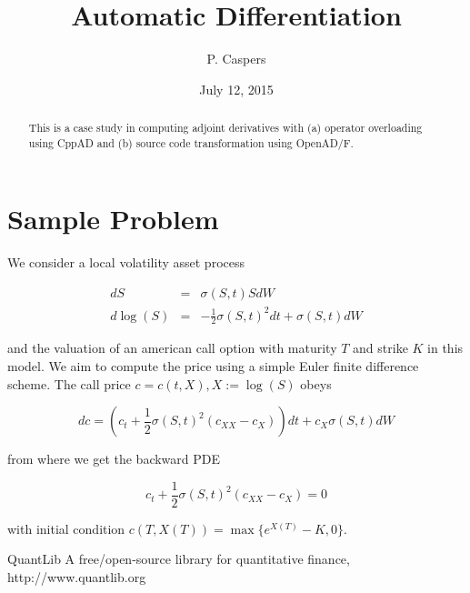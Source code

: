 \documentclass{amsart}
\theoremstyle{plain}
\numberwithin{equation}{section}
\begin{document}
\title[AD]{Automatic Differentiation}
\author{P. Caspers}
\date{July 12, 2015}
\begin{abstract}
This is a case study in computing adjoint derivatives with (a) operator overloading using CppAD and (b) source code transformation using OpenAD/F.
\end{abstract}

\maketitle

\tableofcontents

\section{Sample Problem}

We consider a local volatility asset process 

\begin{eqnarray}
dS &=& \sigma(S,t) S dW \\
d\log(S) &=& -\frac{1}{2}\sigma(S,t)^2 dt + \sigma(S,t) dW
\end{eqnarray}

and the valuation of an american call option with maturity $T$ and strike $K$ in this model. We aim to compute the price using a simple Euler finite difference scheme. The call price $c = c(t,X), X:=\log(S)$ obeys

\begin{equation}
dc = \left(c_t + \frac{1}{2} \sigma(S,t)^2 (c_{XX}-c_{X}) \right) dt + c_X \sigma(S,t) dW 
\end{equation}

from where we get the backward PDE

\begin{equation}
c_t + \frac{1}{2}\sigma(S,t)^2(c_{XX}-c_X) = 0
\end{equation}

with initial condition $c(T,X(T)) = \max\{ e^{X(T)}  - K, 0 \}$.





\begin{thebibliography}{2}

QuantLib A free/open-source library for quantitative finance, http://www.quantlib.org

\end{thebibliography}
\end{document}
